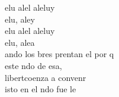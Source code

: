 \begin{cancion}%
	elu  alel aleluy\\
	elu, aley\\
	elu  alel aleluy\\
	elu, alea\\
\jump
	ando los bres prentan el por q \\
	 este ndo de esa,\\
	 libertcoenza a convenr\\
	isto en el ndo fue le\\
\end{cancion}%
